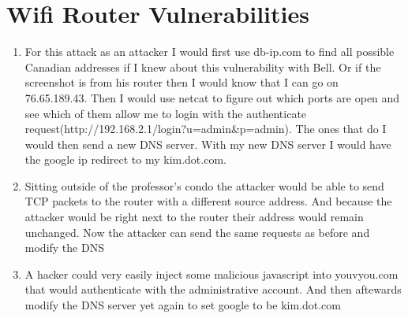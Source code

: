 \documentclass{article}
\begin{document}
\section{Wifi Router Vulnerabilities}
\begin{enumerate}[A]
	\item
		For this attack as an attacker I would first use db-ip.com to find all
		possible Canadian addresses if I knew about this vulnerability with
		Bell. Or if the screenshot is from his router then I would know that I
		can go on 76.65.189.43. 
		Then I would use netcat to figure out which ports are open and see
		which of them allow me to login with the authenticate
		request(http://192.168.2.1/login?u=admin&p=admin). The ones that do I
		would then send a new DNS server. With my new DNS server I would have
		the google ip redirect to my kim.dot.com.
	\item
		Sitting outside of the professor's condo the attacker would be able to
		send TCP packets to the router with a different source address. And
		because the attacker would be right next to the router their address
		would remain unchanged. Now the attacker can send the same requests as
		before and modify the DNS 
	\item
		A hacker could very easily inject some malicious javascript into
		youvyou.com that would authenticate with the administrative account. And
		then aftewards modify the DNS server yet again to set google to be
		kim.dot.com
\end{enumerate}
\end{document}

